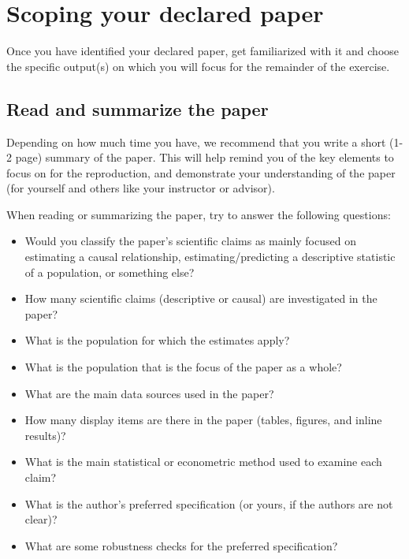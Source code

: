 \documentclass[]{book}
\providecommand{\tightlist}{%
  \setlength{\itemsep}{0pt}\setlength{\parskip}{0pt}}
\begin{document}
\hypertarget{scoping-your-declared-paper}{%
\section{Scoping your declared paper}\label{scoping-your-declared-paper}}

Once you have identified your declared paper, get familiarized with it and choose the specific output(s) on which you will focus for the remainder of the exercise.

\hypertarget{read-sum}{%
\subsection{Read and summarize the paper}\label{read-sum}}

Depending on how much time you have, we recommend that you write a short (1-2 page) summary of the paper. This will help remind you of the key elements to focus on for the reproduction, and demonstrate your understanding of the paper (for yourself and others like your instructor or advisor).

When reading or summarizing the paper, try to answer the following questions:

\begin{itemize}
\tightlist
\item
  Would you classify the paper's scientific claims as mainly focused on estimating a causal relationship, estimating/predicting a descriptive statistic of a population, or something else?
\item
  How many scientific claims (descriptive or causal) are investigated in the paper?
\item
  What is the population for which the estimates apply?
\item
  What is the population that is the focus of the paper as a whole?
\item
  What are the main data sources used in the paper?
\item
  How many display items are there in the paper (tables, figures, and inline results)?\\
\item
  What is the main statistical or econometric method used to examine each claim?
\item
  What is the author's preferred specification (or yours, if the authors are not clear)?
\item
  What are some robustness checks for the preferred specification?
\end{itemize}
\end{document}
